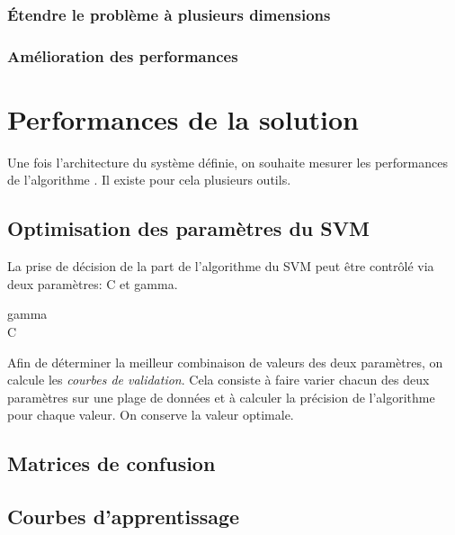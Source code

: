 \subsubsection{Étendre le problème à plusieurs dimensions }
\label{Automatisation du processus d'investigation: Reconnaissance de motifs: Étendre le problème à plusieurs dimensions}


\subsubsection{Amélioration des performances}
\label{Automatisation du processus d'investigation: Reconnaissance de motifs: Amélioration des performances}




\section{Performances de la solution}
\label{Automatisation du processus d'investigation: Performances de la solution}
Une fois l'architecture du système définie, on souhaite mesurer les performances de l'algorithme . Il existe pour cela plusieurs outils.

\subsection{Optimisation des paramètres du SVM}
\label{Industrialisation du produit: Performances de la solution:Optimisation des paramètres du SVM}
La prise de décision de la part de l'algorithme du SVM peut être contrôlé via deux paramètres: C et gamma.
\begin{description}
	\item [gamma] 
	\item [C]
\end{description}

Afin de déterminer la meilleur combinaison de valeurs des deux paramètres, on calcule les \emph{courbes de validation}. Cela consiste à faire varier chacun des deux paramètres sur une plage de données et à calculer la précision de l'algorithme pour chaque valeur. On conserve la valeur optimale. 

\subsection{Matrices de confusion}
\label{Industrialisation du produit: Performances de la solution:Matrices de confusion}

\subsection{Courbes d'apprentissage}
\label{Industrialisation du produit: Performances de la solution:Courbes d'apprentissage}